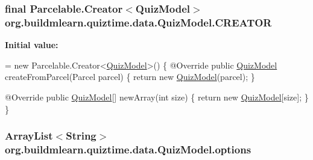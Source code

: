 \subsubsection[{\texorpdfstring{C\+R\+E\+A\+T\+OR}{CREATOR}}]{\setlength{\rightskip}{0pt plus 5cm}final Parcelable.\+Creator$<${\bf Quiz\+Model}$>$ org.\+buildmlearn.\+quiztime.\+data.\+Quiz\+Model.\+C\+R\+E\+A\+T\+OR}\hypertarget{classorg_1_1buildmlearn_1_1quiztime_1_1data_1_1QuizModel_ac4e21d36758e65d378176b71be2811f3}{}\label{classorg_1_1buildmlearn_1_1quiztime_1_1data_1_1QuizModel_ac4e21d36758e65d378176b71be2811f3}
{\bfseries Initial value\+:}
\begin{DoxyCode}
= \textcolor{keyword}{new} Parcelable.Creator<\hyperlink{classorg_1_1buildmlearn_1_1quiztime_1_1data_1_1QuizModel_a6edd6fc87ecca733758244af765476c4}{QuizModel}>() \{
        @Override
        \textcolor{keyword}{public} \hyperlink{classorg_1_1buildmlearn_1_1quiztime_1_1data_1_1QuizModel_a6edd6fc87ecca733758244af765476c4}{QuizModel} createFromParcel(Parcel parcel) \{
            \textcolor{keywordflow}{return} \textcolor{keyword}{new} \hyperlink{classorg_1_1buildmlearn_1_1quiztime_1_1data_1_1QuizModel_a6edd6fc87ecca733758244af765476c4}{QuizModel}(parcel);
        \}

        @Override
        \textcolor{keyword}{public} \hyperlink{classorg_1_1buildmlearn_1_1quiztime_1_1data_1_1QuizModel_a6edd6fc87ecca733758244af765476c4}{QuizModel}[] newArray(\textcolor{keywordtype}{int} size) \{
            \textcolor{keywordflow}{return} \textcolor{keyword}{new} \hyperlink{classorg_1_1buildmlearn_1_1quiztime_1_1data_1_1QuizModel_a6edd6fc87ecca733758244af765476c4}{QuizModel}[size];
        \}
    \}
\end{DoxyCode}
\subsubsection[{\texorpdfstring{options}{options}}]{\setlength{\rightskip}{0pt plus 5cm}Array\+List$<$String$>$ org.\+buildmlearn.\+quiztime.\+data.\+Quiz\+Model.\+options\hspace{0.3cm}{\ttfamily [private]}}\hypertarget{classorg_1_1buildmlearn_1_1quiztime_1_1data_1_1QuizModel_a1bc4a9ea2622409109f2b6b48080d31c}{}\label{classorg_1_1buildmlearn_1_1quiztime_1_1data_1_1QuizModel_a1bc4a9ea2622409109f2b6b48080d31c}
